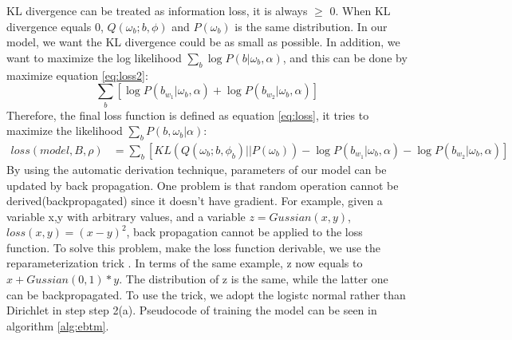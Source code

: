 KL divergence can be treated as information loss, it is always $\geq$ 0. When KL divergence equals 0, $Q(\omega_b;b,\phi)$ and $P(\omega_b)$ is the same distribution. In our model, we want the KL divergence could be as small as possible. In addition, we want to maximize the log likelihood $\sum_b\log P(b|\omega_b, \alpha)$, and this can be done by maximize equation \ref{eq:loss2}:
\begin{equation}
    \sum_b\left[\log P(b_{w_1}|\omega_b,\alpha)+\log P(b_{w_2}|\omega_b,\alpha)\right]
    \label{eq:loss2}
\end{equation}
Therefore, the final loss function is defined as equation \ref{eq:loss}, it tries to maximize the likelihood $\sum_bP(b,\omega_b|\alpha)$:
\begin{equation}
    \begin{aligned}
        loss(model, B, \rho) & = \sum_b\left[KL(Q(\omega_b;b,\phi_b)||P(\omega_b))-\log P(b_{w_1}|\omega_b,\alpha)-\log P(b_{w_2}|\omega_b,\alpha)\right] 
    \end{aligned}    
    \label{eq:loss}
\end{equation}
By using the automatic derivation technique, parameters of our model can be updated by back propagation. One problem is that random operation cannot be derived(backpropagated) since it doesn't have gradient. For example, given a variable x,y with arbitrary values, and a variable $z = Gussian(x,y)$, $loss(x,y) = (x-y)^2$, back propagation cannot be applied to the loss function. To solve this problem, make the loss function derivable, we use the reparameterization trick \cite{kingma2013auto}. In terms of the same example, z now equals to $x + Gussian(0,1) * y$. The distribution of z is the same, while the latter one can be backpropagated. To use the trick, we adopt the logistc normal rather than Dirichlet in step step 2(a). Pseudocode of training the model can be seen in algorithm \ref{alg:ebtm}.
